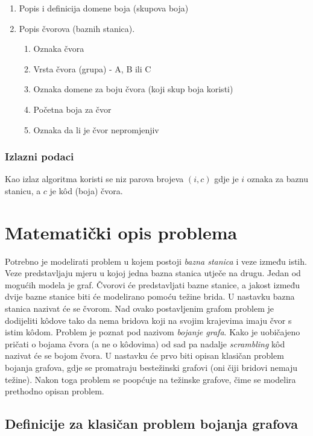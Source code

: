 \documentclass[times, utf8, diplomski, numeric]{fer}
\begin{document}
\begin{enumerate}
	\item Popis i definicija domene boja (skupova boja)
	\item Popis čvorova (baznih stanica).
		\begin{enumerate}
			\item Oznaka čvora
			\item Vrsta čvora (grupa) - A, B ili C
			\item Oznaka domene za boju čvora (koji skup boja koristi)
			\item Početna boja za čvor
			\item Oznaka da li je čvor nepromjenjiv
		\end{enumerate}
\end{enumerate} 

\subsubsection{Izlazni podaci}

Kao izlaz algoritma koristi se niz parova brojeva $(i, c)$ gdje je $i$ oznaka za baznu stanicu, a $c$ je k\^{o}d (boja) čvora.

\section{Matematički opis problema}

Potrebno je modelirati problem u kojem postoji \emph{bazna stanica} i veze između istih. Veze predstavljaju mjeru u kojoj jedna bazna stanica utječe na drugu. Jedan od mogućih modela je graf. Čvorovi će predstavljati bazne stanice, a jakost između dvije bazne stanice biti će modelirano pomoću težine brida. U nastavku bazna stanica nazivat će se čvorom. Nad ovako postavljenim grafom problem je dodijeliti k\^{o}dove tako da nema bridova koji na svojim krajevima imaju čvor s istim k\^{o}dom. Problem je poznat pod nazivom \emph{bojanje grafa}. Kako je uobičajeno pričati o bojama čvora (a ne o k\^{o}dovima) od sad pa nadalje \emph{scrambling} k\^{o}d nazivat će se bojom čvora. U nastavku će prvo biti opisan klasičan problem bojanja grafova, gdje se promatraju bestežinski grafovi (oni čiji bridovi nemaju težine). Nakon toga problem se poopćuje na težinske grafove, čime se modelira prethodno opisan problem.

\subsection{Definicije za klasičan problem bojanja grafova}
\end{document}
